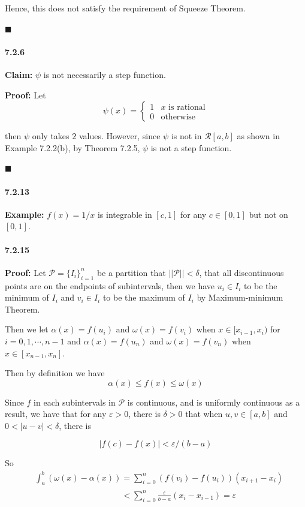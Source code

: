 \documentclass[11pt]{article}
\newcommand{\qed}{
	\begin{flushright}
		$\blacksquare$
	\end{flushright}}
\begin{document}
		Hence, this does not satisfy the requirement of Squeeze Theorem.
		\qed
		
	\paragraph{7.2.6}
		\textbf{Claim:} $\psi$ is not necessarily a step function.
		
		\textbf{Proof:} Let 
		\[\psi(x) = \begin{cases}
			1 & \text{$x$ is rational}\\
			0 & \text{otherwise} 
		\end{cases}	\]
		
		then $\psi$ only takes $2$ values. However, since $\psi$ is not in $\mathcal{R}[a, b]$ as shown in Example 7.2.2(b), by Theorem 7.2.5, $\psi$ is not a step function.
		\qed
		
	\paragraph{7.2.13}
		\textbf{Example:} $f(x) = 1/x$ is integrable in $[c, 1]$ for any $c \in [0, 1]$ but not on $[0, 1]$.
		
	\paragraph{7.2.15}\textbf{Proof:}
		Let $\mathcal{P} = \{I_i\}_{i = 1}^n$ be a partition that $||\mathcal{P}|| < \delta$, that all discontinuous points are on the endpoints of subintervals, then we have $u_i \in I_i$ to be the minimum of $I_i$ and $v_i \in I_i$ to be the maximum of $I_i$ by Maximum-minimum Theorem.
		
		Then we let $\alpha(x) = f(u_i)$ and $\omega(x) = f(v_i)$ when $x \in [x_{i - 1}, x_i)$ for $i = 0, 1, \cdots, n - 1$ and $\alpha(x) = f(u_n)$ and $\omega(x) = f(v_n)$ when $x \in [x_{n - 1}, x_n]$.
		
		Then by definition we have 
		\[\alpha(x) \leq f(x) \leq \omega(x)\]
		
		Since $f$ in each subintervals in $\mathcal{P}$ is continuous, and is uniformly continuous as a result, we have that for any $\varepsilon > 0$, there is $\delta > 0$ that when $u, v \in [a, b]$ and $0  < |u - v| < \delta$, there is
		
		\[|f(c) - f(x)| < \varepsilon/ (b - a) \]
		
		So 
		\begin{align}
			&\int_a^b (\omega(x) - \alpha(x)) = \sum_{i = 0}^{n} (f(v_i) - f(u_i))(x_{i + 1} - x_i)\nonumber\\
			&\phantom{\int_a^b (\omega(x) - \alpha(x))} < \sum_{i = 0}^{n} \frac{\varepsilon}{b - a}(x_{i} - x_{i - 1}) = \varepsilon\nonumber
		\end{align}
		
\end{document}

